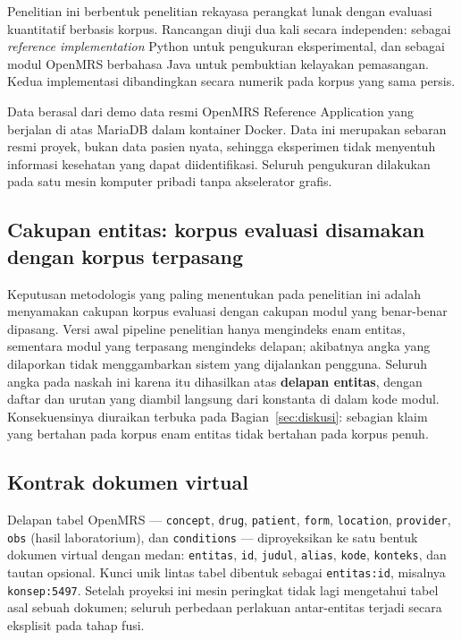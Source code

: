 \documentclass[journal,twoside,web]{ieeecolor}
\begin{document}
Penelitian ini berbentuk penelitian rekayasa perangkat lunak dengan evaluasi
kuantitatif berbasis korpus. Rancangan diuji dua kali secara independen: sebagai
\emph{reference implementation} Python untuk pengukuran eksperimental, dan
sebagai modul OpenMRS berbahasa Java untuk pembuktian kelayakan pemasangan.
Kedua implementasi dibandingkan secara numerik pada korpus yang sama persis.

Data berasal dari demo data resmi OpenMRS Reference Application yang berjalan di
atas MariaDB dalam kontainer Docker. Data ini merupakan sebaran resmi proyek,
bukan data pasien nyata, sehingga eksperimen tidak menyentuh informasi kesehatan
yang dapat diidentifikasi. Seluruh pengukuran dilakukan pada satu mesin komputer
pribadi tanpa akselerator grafis.

\subsection{Cakupan entitas: korpus evaluasi disamakan dengan korpus terpasang}

Keputusan metodologis yang paling menentukan pada penelitian ini adalah menyamakan
cakupan korpus evaluasi dengan cakupan modul yang benar-benar dipasang. Versi
awal pipeline penelitian hanya mengindeks enam entitas, sementara modul yang
terpasang mengindeks delapan; akibatnya angka yang dilaporkan tidak
menggambarkan sistem yang dijalankan pengguna. Seluruh angka pada naskah ini
karena itu dihasilkan atas \textbf{delapan entitas}, dengan daftar dan urutan
yang diambil langsung dari konstanta di dalam kode modul. Konsekuensinya
diuraikan terbuka pada Bagian~\ref{sec:diskusi}: sebagian klaim yang bertahan
pada korpus enam entitas tidak bertahan pada korpus penuh.

\subsection{Kontrak dokumen virtual}

Delapan tabel OpenMRS --- \texttt{concept}, \texttt{drug}, \texttt{patient},
\texttt{form}, \texttt{location}, \texttt{provider}, \texttt{obs} (hasil
laboratorium), dan \texttt{conditions} --- diproyeksikan ke satu bentuk dokumen
virtual dengan medan: \texttt{entitas}, \texttt{id}, \texttt{judul},
\texttt{alias}, \texttt{kode}, \texttt{konteks}, dan tautan opsional. Kunci unik
lintas tabel dibentuk sebagai \texttt{entitas:id}, misalnya \texttt{konsep:5497}.
Setelah proyeksi ini mesin peringkat tidak lagi mengetahui tabel asal sebuah
dokumen; seluruh perbedaan perlakuan antar-entitas terjadi secara eksplisit pada
tahap fusi.
\end{document}
